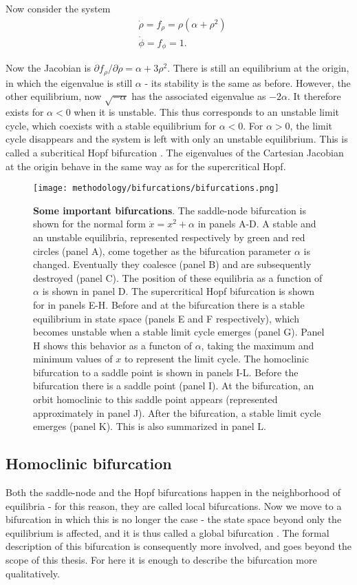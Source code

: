 Now consider the system
%
\begin{align}
    &\dot{\rho} = f_\rho = \rho(\alpha + \rho^2) \\ 
    &\dot{\phi} = f_\phi = 1.
\end{align}

Now the Jacobian is $\partial f_\rho / \partial \rho = \alpha + 3\rho^2$. There is still an equilibrium at the origin, in which the eigenvalue is still $\alpha$ - its stability is the same as before. However, the other equilibrium, now $\sqrt{-\alpha}$ has the associated eigenvalue as $-2\alpha$. It therefore exists for $\alpha < 0$ when it is unstable. This thus corresponds to an unstable limit cycle, which coexists with a stable equilibrium for $\alpha < 0$. For $\alpha > 0$, the limit cycle disappears and the system is left with only an unstable equilibrium. This is called a subcritical Hopf bifurcation \cite{kuznetsov}. The eigenvalues of the Cartesian Jacobian at the origin behave in the same way as for the supercritical Hopf.
%
\begin{figure}
    \centering 
    \texttt{[image: methodology/bifurcations/bifurcations.png]}
    \caption{\textbf{Some important bifurcations}. The saddle-node bifurcation is shown for the normal form $\dot{x} = x^2 + \alpha$ in panels A-D. A stable and an unstable equilibria, represented respectively by green and red circles (panel A), come together as the bifurcation parameter $\alpha$ is changed. Eventually they coalesce (panel B) and are subsequently destroyed (panel C). The position of these equilibria as a function of $\alpha$ is shown in panel D. The supercritical Hopf bifurcation is shown for  in panels E-H. Before and at the bifurcation there is a stable equilibrium in state space (panels E and F respectively), which becomes unstable when a stable limit cycle emerges (panel G). Panel H shows this behavior as a functon of $\alpha$, taking the maximum and minimum values of $x$ to represent the limit cycle. The homoclinic bifurcation to a saddle point is shown in panels I-L. Before the bifurcation there is a saddle point (panel I). At the bifurcation, an orbit homoclinic to this saddle point appears (represented approximately in panel J). After the bifurcation, a stable limit cycle emerges (panel K). This is also summarized in panel L.}
    \label{fig:method:bifurcations}
\end{figure}





\subsection{Homoclinic bifurcation}
Both the saddle-node and the Hopf bifurcations happen in the neighborhood of equilibria - for this reason, they are called local bifurcations. Now we move to a bifurcation in which this is no longer the case - the state space beyond only the equilibrium is affected, and it is thus called a global bifurcation \cite{kuznetsov}. The formal description of this bifurcation is consequently more involved, and goes beyond the scope of this thesis. For here it is enough to describe the bifurcation more qualitatively. 

